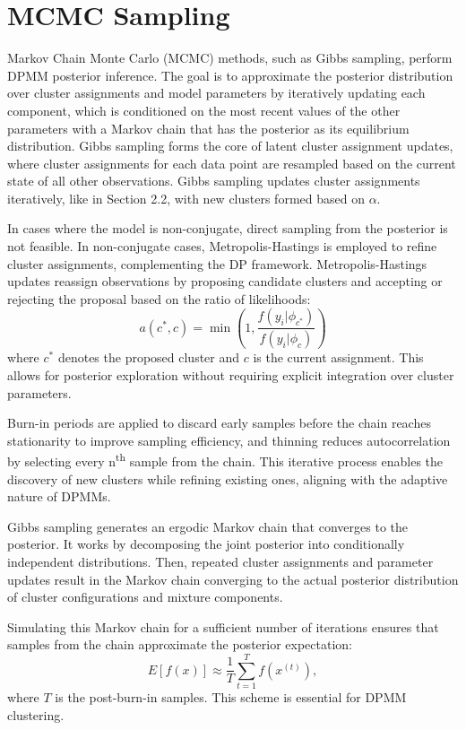 \documentclass[12pt]{report} %
\begin{document}
\section{MCMC Sampling}
Markov Chain Monte Carlo (MCMC) methods, such as Gibbs sampling, perform DPMM posterior inference. The goal is to approximate the posterior distribution over cluster assignments and model parameters by iteratively updating each component, which is conditioned on the most recent values of the other parameters with a Markov chain that has the posterior as its equilibrium distribution.\cite{neal2000markov} Gibbs sampling forms the core of latent cluster assignment updates, where cluster assignments for each data point are resampled based on the current state of all other observations. Gibbs sampling updates cluster assignments iteratively, like in Section 2.2, with new clusters formed based on $\alpha$.

In cases where the model is non-conjugate, direct sampling from the posterior is not feasible. In non-conjugate cases, Metropolis-Hastings is employed to refine cluster assignments, complementing the DP framework. Metropolis-Hastings updates reassign observations by proposing candidate clusters and accepting or rejecting the proposal based on the ratio of likelihoods:
\[
a(c^*, c) = \min \left( 1, \frac{f(y_i | \phi_{c^*})}{f(y_i | \phi_c)} \right)
\]
where $c^*$ denotes the proposed cluster and $c$ is the current assignment.\cite{neal2000markov} This allows for posterior exploration without requiring explicit integration over cluster parameters.

Burn-in periods are applied to discard early samples before the chain reaches stationarity to improve sampling efficiency, and thinning reduces autocorrelation by selecting every n\textsuperscript{th} sample from the chain. This iterative process enables the discovery of new clusters while refining existing ones, aligning with the adaptive nature of DPMMs.

Gibbs sampling generates an ergodic Markov chain that converges to the posterior.\cite{neal2000markov} It works by decomposing the joint posterior into conditionally independent distributions. Then, repeated cluster assignments and parameter updates result in the Markov chain converging to the actual posterior distribution of cluster configurations and mixture components.

Simulating this Markov chain for a sufficient number of iterations ensures that samples from the chain approximate the posterior expectation:
\[
E[f(x)] \approx \frac{1}{T} \sum_{t=1}^{T} f(x^{(t)}),
\]
where \( T \) is the post-burn-in samples.\cite{neal2000markov} This scheme is essential for DPMM clustering. 
\end{document}
